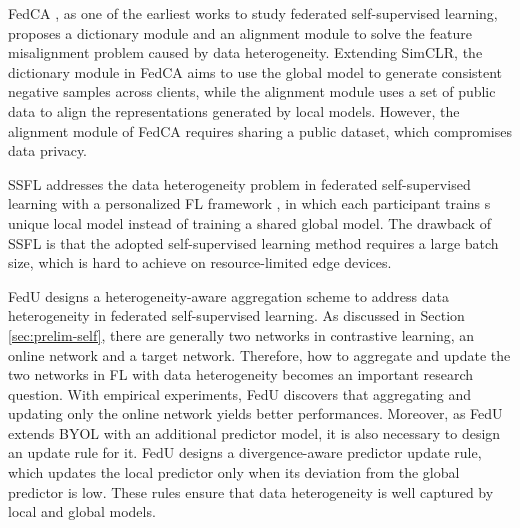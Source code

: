 \documentclass[11pt]{article}
\begin{document}
FedCA \cite{zhang2020federated}, as one of the earliest works to study federated self-supervised learning, proposes a dictionary module and an alignment module to solve the feature misalignment problem caused by data heterogeneity. Extending SimCLR, the dictionary module in FedCA aims to use the global model to generate consistent negative samples across clients, while the alignment module uses a set of public data to align the representations generated by local models. However, the alignment module of FedCA requires sharing a public dataset, which compromises data privacy. 

SSFL \cite{he2021ssfl} addresses the data heterogeneity problem in federated self-supervised learning with a personalized FL framework \cite{tan2022towards,li2021ditto}, in which each participant trains s unique local model instead of training a shared global model. The drawback of SSFL is that the adopted self-supervised learning method requires a large batch size, which is hard to achieve on resource-limited edge devices. 

FedU \cite{zhuang2021collaborative} designs a heterogeneity-aware aggregation scheme to address data heterogeneity in federated self-supervised learning. As discussed in Section \ref{sec:prelim-self}, there are generally two networks in contrastive learning, an online network and a target network. Therefore, how to aggregate and update the two networks in FL with data heterogeneity becomes an important research question. With empirical experiments, FedU discovers that aggregating and updating only the online network yields better performances. Moreover, as FedU extends BYOL with an additional predictor model, it is also necessary to design an update rule for it. FedU designs a divergence-aware predictor update rule, which updates the local predictor only when its deviation from the global predictor is low. These rules ensure that data heterogeneity is well captured by local and global models.  
\end{document}
